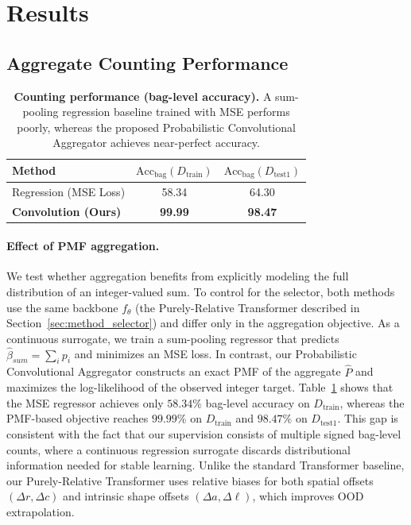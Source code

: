 \documentclass{article}
\theoremstyle{plain}
\theoremstyle{definition}
\theoremstyle{remark}
\begin{document}
\section{Results}
\label{sec:results}

\subsection{Aggregate Counting Performance}
\label{sec:quant_results}

\begin{table}[h]
	\centering
\caption{\textbf{Counting performance (bag-level accuracy).}
A sum-pooling regression baseline trained with MSE performs poorly, whereas the proposed Probabilistic Convolutional Aggregator achieves near-perfect accuracy.}

	\label{tab:ablation_counting}
	\begin{tabular}{lcc}
		\toprule
		\textbf{Method} & 		$\mathrm{Acc}_{\text{bag}}(D_{\text{train}})$ &
		$\mathrm{Acc}_{\text{bag}}(D_{\text{test1}})$  \\
		\midrule
		Regression (MSE Loss) & 58.34 & 64.30 \\
		\textbf{Convolution (Ours)} & \textbf{99.99} & \textbf{98.47} \\
		\bottomrule
	\end{tabular}
\end{table}
\paragraph{Effect of PMF aggregation.}
We test whether aggregation benefits from explicitly modeling the full distribution of an integer-valued sum.
To control for the selector, both methods use the same backbone $f_\theta$ (the Purely-Relative Transformer described in Section~\ref{sec:method_selector}) and differ only in the aggregation objective.
As a continuous surrogate, we train a sum-pooling regressor that predicts $\hat{\beta}_{sum}=\sum_i p_i$ and minimizes an MSE loss.
In contrast, our Probabilistic Convolutional Aggregator constructs an exact PMF of the aggregate $\hat{P}$ and maximizes the log-likelihood of the observed integer target.
Table~\ref{tab:ablation_counting} shows that the MSE regressor achieves only $58.34\%$ bag-level accuracy on $D_{\text{train}}$, whereas the PMF-based objective reaches $99.99\%$ on $D_{\text{train}}$ and $98.47\%$ on $D_{\text{test1}}$.
This gap is consistent with the fact that our supervision consists of multiple signed bag-level counts, where a continuous regression surrogate discards distributional information needed for stable learning. 
Unlike the standard Transformer baseline, our Purely-Relative Transformer uses relative biases for both spatial offsets $(\Delta r,\Delta c)$ and intrinsic shape offsets $(\Delta a,\Delta \ell)$, which improves OOD extrapolation.
\end{document}

